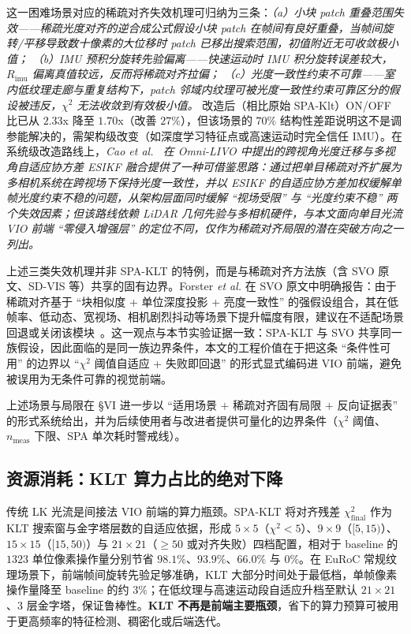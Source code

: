 \documentclass[letterpaper,journal]{IEEEtran}
\begin{document}
这一困难场景对应的稀疏对齐失效机理可归纳为三条：\textit{（a）小块 patch 重叠范围失效——稀疏光度对齐的逆合成公式假设小块 patch 在帧间有良好重叠，当帧间旋转/平移导致数十像素的大位移时 patch 已移出搜索范围，初值附近无可收敛极小值；} \textit{（b）IMU 预积分旋转先验偏离——快速运动时 IMU 积分旋转误差较大，$R_{\mathrm{imu}}$ 偏离真值较远，反而将稀疏对齐拉偏；} \textit{（c）光度一致性约束不可靠——室内低纹理走廊与重复结构下，patch 邻域内纹理可被光度一致性约束可靠区分的假设被违反，$\chi^2$ 无法收敛到有效极小值。} 改造后（相比原始 SPA-Klt）ON/OFF 比已从 $2.33$x 降至 $1.70$x（改善 $27\%$），但该场景的 $70\%$ 结构性差距说明这不是调参能解决的，需架构级改变（如深度学习特征点或高速运动时完全信任 IMU）。在系统级改造路线上，\textit{Cao \emph{et al.}~\cite{cao2026omnilivo} 在 Omni-LIVO 中提出的跨视角光度迁移与多视角自适应协方差 ESIKF 融合提供了一种可借鉴思路：通过把单目稀疏对齐扩展为多相机系统在跨视场下保持光度一致性，并以 ESIKF 的自适应协方差加权缓解单帧光度约束不稳的问题，从架构层面同时缓解 ``视场受限'' 与 ``光度约束不稳'' 两个失效因素；但该路线依赖 LiDAR 几何先验与多相机硬件，与本文面向单目光流 VIO 前端 ``零侵入增强层'' 的定位不同，仅作为稀疏对齐局限的潜在突破方向之一列出。}

上述三类失效机理并非 SPA-KLT 的特例，而是与稀疏对齐方法族（含 SVO 原文、SD-VIS 等）共享的固有边界。Forster \textit{et al.} 在 SVO 原文中明确报告：由于稀疏对齐基于 ``块相似度 + 单位深度投影 + 亮度一致性'' 的强假设组合，其在低帧率、低动态、宽视场、相机剧烈抖动等场景下提升幅度有限，建议在不适配场景回退或关闭该模块~\cite{forster2017svo}。这一观点与本节实验证据一致：SPA-KLT 与 SVO 共享同一族假设，因此面临的是同一族边界条件，本文的工程价值在于把这条 ``条件性可用'' 的边界以 ``$\chi^2$ 阈值自适应 + 失败即回退'' 的形式显式编码进 VIO 前端，避免被误用为无条件可靠的视觉前端。

上述场景与局限在 §VI 进一步以 ``适用场景 $+$ 稀疏对齐固有局限 $+$ 反向证据表'' 的形式系统给出，并为后续使用者与改进者提供可量化的边界条件（$\chi^2$ 阈值、$n_{\mathrm{meas}}$ 下限、SPA 单次耗时警戒线）。

\subsection{资源消耗：KLT 算力占比的绝对下降}

传统 LK 光流是间接法 VIO 前端的算力瓶颈。SPA-KLT 将对齐残差 $\chi^2_{\mathrm{final}}$ 作为 KLT 搜索窗与金字塔层数的自适应依据，形成 $5\times5$（$\chi^2<5$）、$9\times9$（$[5,15)$）、$15\times15$（$[15,50)$）与 $21\times21$（$\ge 50$ 或对齐失败）四档配置，相对于 baseline 的 $1323$ 单位像素操作量分别节省 $98.1\%$、$93.9\%$、$66.0\%$ 与 $0\%$。在 EuRoC 常规纹理场景下，前端帧间旋转先验足够准确，KLT 大部分时间处于最低档，单帧像素操作量降至 baseline 的约 $3\%$；在低纹理与高速运动段自适应升档至默认 $21\times21$、3 层金字塔，保证鲁棒性。\textbf{KLT 不再是前端主要瓶颈}，省下的算力预算可被用于更高频率的特征检测、稠密化或后端迭代。
\end{document}
